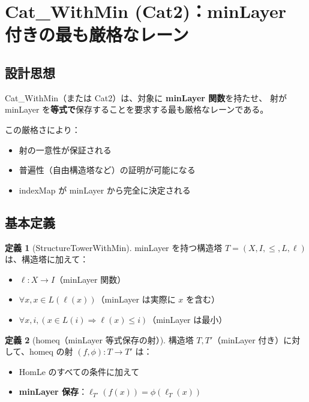 \documentclass{ltjsarticle}
\theoremstyle{definition}
\newtheorem{definition}{定義}[section]
\begin{document}
\section{Cat\_WithMin (Cat2)：minLayer 付きの最も厳格なレーン}
\label{sec:cat-withmin}

\subsection{設計思想}

Cat\_WithMin（または Cat2）は、対象に \textbf{minLayer 関数}を持たせ、
射が minLayer を\textbf{等式で}保存することを要求する最も厳格なレーンである。

この厳格さにより：
\begin{itemize}
  \item 射の一意性が保証される
  \item 普遍性（自由構造塔など）の証明が可能になる
  \item indexMap が minLayer から完全に決定される
\end{itemize}

\subsection{基本定義}

\begin{definition}[StructureTowerWithMin]
minLayer を持つ構造塔 $T = (X, I, \leq, L, \ell)$ は、構造塔に加えて：
\begin{itemize}
  \item $\ell: X \to I$（minLayer 関数）
  \item $\forall x, x \in L(\ell(x))$（minLayer は実際に $x$ を含む）
  \item $\forall x, i, (x \in L(i) \Rightarrow \ell(x) \leq i)$（minLayer は最小）
\end{itemize}
\end{definition}

\begin{definition}[homeq（minLayer 等式保存の射）]
構造塔 $T, T'$（minLayer 付き）に対して、homeq の射 $(f, \phi): T \to T'$ は：
\begin{itemize}
  \item HomLe のすべての条件に加えて
  \item \textbf{minLayer 保存}：$\ell_{T'}(f(x)) = \phi(\ell_T(x))$
\end{itemize}
\end{definition}
\end{document}
